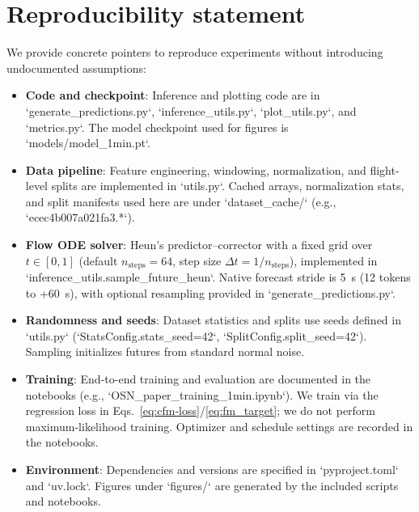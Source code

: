 \documentclass[
  manuscript=proceedings,  %
  layout=preprint,  %
  year=20xx,
  volume=x,
]{extra/joas}
\begin{document}
\section*{Reproducibility statement}
We provide concrete pointers to reproduce experiments without introducing undocumented assumptions:
\begin{itemize}
  \item \textbf{Code and checkpoint}: Inference and plotting code are in `generate_predictions.py`, `inference_utils.py`, `plot_utils.py`, and `metrics.py`. The model checkpoint used for figures is `models/model_1min.pt`.
  \item \textbf{Data pipeline}: Feature engineering, windowing, normalization, and flight-level splits are implemented in `utils.py`. Cached arrays, normalization stats, and split manifests used here are under `dataset_cache/` (e.g., `ecec4b007a021fa3.*`).
  \item \textbf{Flow ODE solver}: Heun's predictor–corrector with a fixed grid over $t\in[0,1]$ (default $n_{\text{steps}}{=}64$, step size $\Delta t{=}1/n_{\text{steps}}$), implemented in `inference_utils.sample_future_heun`. Native forecast stride is 5~s (12 tokens to +60~s), with optional resampling provided in `generate_predictions.py`.
  \item \textbf{Randomness and seeds}: Dataset statistics and splits use seeds defined in `utils.py` (`StatsConfig.stats_seed{=}42`, `SplitConfig.split_seed{=}42`). Sampling initializes futures from standard normal noise.
  \item \textbf{Training}: End-to-end training and evaluation are documented in the notebooks (e.g., `OSN_paper_training_1min.ipynb`). We train via the regression loss in Eqs.~\eqref{eq:cfm-loss}/\eqref{eq:fm_target}; we do not perform maximum-likelihood training. Optimizer and schedule settings are recorded in the notebooks.
  \item \textbf{Environment}: Dependencies and versions are specified in `pyproject.toml` and `uv.lock`. Figures under `figures/` are generated by the included scripts and notebooks.
\end{itemize}


\printbibliography
\end{document}
